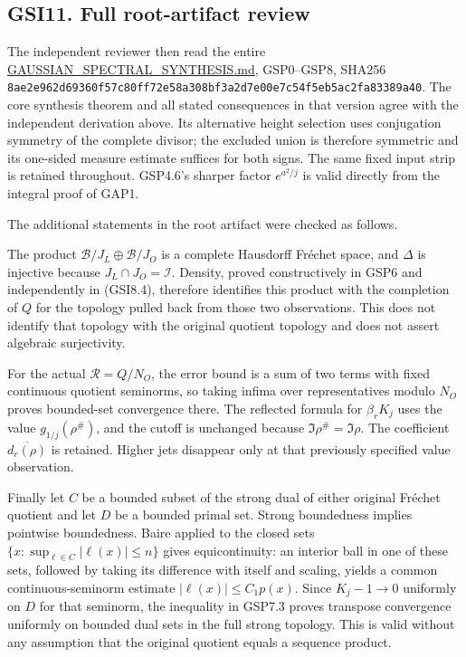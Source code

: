 \subsection{GSI11. Full root-artifact
review}\label{gsi11.-full-root-artifact-review}

The independent reviewer then read the entire
\href{https://github.com/KokunoYumeto/zeta-function-research-reader/blob/main/workbenches/splitzero-tandem/continuations/20260925-full-source-tensor-and-original-divisor/gct/GAUSSIAN_SPECTRAL_SYNTHESIS.md}{GAUSSIAN\_SPECTRAL\_SYNTHESIS.md},
GSP0--GSP8, SHA256
\texttt{8ae2e962d69360f57c80ff72e58a308bf3a2d7e00e7c54f5eb5ac2fa83389a40}.
The core synthesis theorem and all stated consequences in that version
agree with the independent derivation above. Its alternative height
selection uses conjugation symmetry of the complete divisor; the
excluded union is therefore symmetric and its one-sided measure estimate
suffices for both signs. The same fixed input strip is retained
throughout. GSP4.6's sharper factor \(e^{a^2/j}\) is valid directly from
the integral proof of GAP1.

The additional statements in the root artifact were checked as follows.

The product \(\mathcal B/J_L\oplus\mathcal B/J_O\) is a complete
Hausdorff Fréchet space, and \(\Delta\) is injective because
\(J_L\cap J_O=\mathcal I\). Density, proved constructively in GSP6 and
independently in (GSI8.4), therefore identifies this product with the
completion of \(Q\) for the topology pulled back from those two
observations. This does not identify that topology with the original
quotient topology and does not assert algebraic surjectivity.

For the actual \(\mathcal R=Q/N_O\), the error bound is a sum of two
terms with fixed continuous quotient seminorms, so taking infima over
representatives modulo \(N_O\) proves bounded-set convergence there. The
reflected formula for \(\beta_rK_j\) uses the value
\(g_{1/j}(\rho^\#)\), and the cutoff is unchanged because
\(\Im\rho^\#=\Im\rho\). The coefficient \(\overline{d_r(\rho)}\) is
retained. Higher jets disappear only at that previously specified value
observation.

Finally let \(C\) be a bounded subset of the strong dual of either
original Fréchet quotient and let \(D\) be a bounded primal set. Strong
boundedness implies pointwise boundedness. Baire applied to the closed
sets \(\{x:\sup_{\ell\in C}|\ell(x)|\le n\}\) gives equicontinuity: an
interior ball in one of these sets, followed by taking its difference
with itself and scaling, yields a common continuous-seminorm estimate
\(|\ell(x)|\le C_1p(x)\). Since \(K_j-1\to0\) uniformly on \(D\) for
that seminorm, the inequality in GSP7.3 proves transpose convergence
uniformly on bounded dual sets in the full strong topology. This is
valid without any assumption that the original quotient equals a
sequence product.

